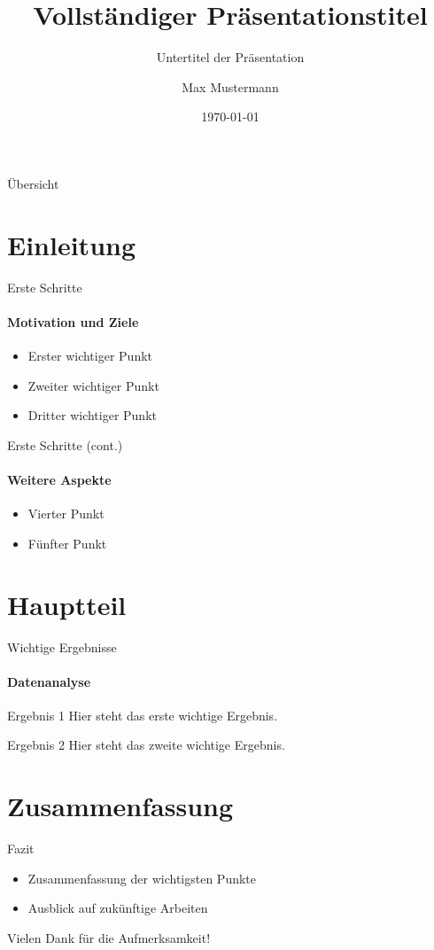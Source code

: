 \documentclass{ltx-talk}
\title[Kurztitel]{Vollständiger Präsentationstitel}
\subtitle{Untertitel der Präsentation}
\author[M. Mustermann]{Max Mustermann}
\institute{Universität Beispielstadt}
\date{\today}
\begin{document}
\begin{frame}
  \titlepage
\end{frame}

\begin{frame}{Übersicht}
  \tableofcontents
\end{frame}

\section{Einleitung}

\begin{frame}{Erste Schritte}
  \framesubtitle{Motivation und Ziele}
  \begin{itemize}
    \item Erster wichtiger Punkt
    \item Zweiter wichtiger Punkt
    \item Dritter wichtiger Punkt
  \end{itemize}
\end{frame}

\begin{frame}{Erste Schritte (cont.)}
  \framesubtitle{Weitere Aspekte}
  \begin{itemize}
    \item Vierter Punkt
    \item Fünfter Punkt
  \end{itemize}
\end{frame}

\section{Hauptteil}

\begin{frame}{Wichtige Ergebnisse}
  \framesubtitle{Datenanalyse}
  \begin{block}{Ergebnis 1}
    Hier steht das erste wichtige Ergebnis.
  \end{block}
  
  \begin{block}{Ergebnis 2}
    Hier steht das zweite wichtige Ergebnis.
  \end{block}
\end{frame}

\section{Zusammenfassung}

\begin{frame}{Fazit}
  \begin{itemize}
    \item Zusammenfassung der wichtigsten Punkte
    \item Ausblick auf zukünftige Arbeiten
  \end{itemize}
  
  \vfill
  \begin{center}
    \large Vielen Dank für die Aufmerksamkeit!
  \end{center}
\end{frame}
\end{document}
